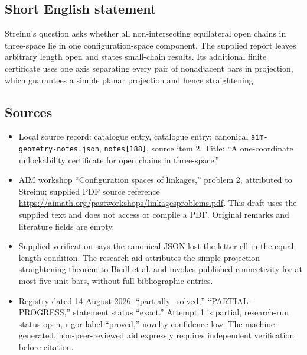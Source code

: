 \documentclass[11pt]{article}
\begin{document}
\subsection{Short English statement}
Streinu's question asks whether all non-intersecting equilateral open chains in three-space lie in one configuration-space component. The supplied report leaves arbitrary length open and states small-chain results. Its additional finite certificate uses one axis separating every pair of nonadjacent bars in projection, which guarantees a simple planar projection and hence straightening.
\subsection{Sources}
\begin{itemize}
\item Local source record: catalogue entry, catalogue entry; canonical \texttt{aim-geometry-notes.json}, \texttt{notes[188]}, source item 2. Title: ``A one-coordinate unlockability certificate for open chains in three-space.''
\item AIM workshop ``Configuration spaces of linkages,'' problem 2, attributed to Streinu; supplied PDF source reference \url{https://aimath.org/pastworkshops/linkagesproblems.pdf}. This draft uses the supplied text and does not access or compile a PDF. Original remarks and literature fields are empty.
\item Supplied verification says the canonical JSON lost the letter ell in the equal-length condition. The research aid attributes the simple-projection straightening theorem to Biedl et al. and invokes published connectivity for at most five unit bars, without full bibliographic entries.
\item Registry dated 14 August 2026: ``partially\_solved,'' ``PARTIAL-PROGRESS,'' statement status ``exact.'' Attempt 1 is partial, research-run status open, rigor label ``proved,'' novelty confidence low. The machine-generated, non-peer-reviewed aid expressly requires independent verification before citation.
\end{itemize}
\end{document}
